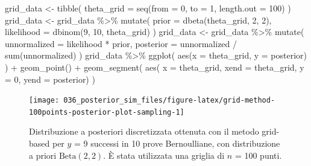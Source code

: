 \documentclass[
  10pt,
  italian,
  a4paper,
  extrafontsizes,onecolumn,openright
  ]{memoir}
\newenvironment{Shaded}{\begin{snugshade}}{\end{snugshade}}
\newcommand{\AttributeTok}[1]{\textcolor[rgb]{0.77,0.63,0.00}{#1}}
\newcommand{\DecValTok}[1]{\textcolor[rgb]{0.00,0.00,0.81}{#1}}
\newcommand{\FunctionTok}[1]{\textcolor[rgb]{0.00,0.00,0.00}{#1}}
\newcommand{\NormalTok}[1]{#1}
\newcommand{\OtherTok}[1]{\textcolor[rgb]{0.56,0.35,0.01}{#1}}
\newcommand{\SpecialCharTok}[1]{\textcolor[rgb]{0.00,0.00,0.00}{#1}}
\begin{document}
\begin{Shaded}
\begin{Highlighting}[]
\NormalTok{grid\_data  }\OtherTok{\textless{}{-}} \FunctionTok{tibble}\NormalTok{(}
  \AttributeTok{theta\_grid =} \FunctionTok{seq}\NormalTok{(}\AttributeTok{from =} \DecValTok{0}\NormalTok{, }\AttributeTok{to =} \DecValTok{1}\NormalTok{, }\AttributeTok{length.out =} \DecValTok{100}\NormalTok{)}
\NormalTok{)}
\NormalTok{grid\_data }\OtherTok{\textless{}{-}}\NormalTok{ grid\_data }\SpecialCharTok{\%\textgreater{}\%}
  \FunctionTok{mutate}\NormalTok{(}
    \AttributeTok{prior =} \FunctionTok{dbeta}\NormalTok{(theta\_grid, }\DecValTok{2}\NormalTok{, }\DecValTok{2}\NormalTok{),}
    \AttributeTok{likelihood =} \FunctionTok{dbinom}\NormalTok{(}\DecValTok{9}\NormalTok{, }\DecValTok{10}\NormalTok{, theta\_grid)}
\NormalTok{  )}
\NormalTok{grid\_data }\OtherTok{\textless{}{-}}\NormalTok{ grid\_data }\SpecialCharTok{\%\textgreater{}\%}
  \FunctionTok{mutate}\NormalTok{(}
    \AttributeTok{unnormalized =}\NormalTok{ likelihood }\SpecialCharTok{*}\NormalTok{ prior,}
    \AttributeTok{posterior =}\NormalTok{ unnormalized }\SpecialCharTok{/} \FunctionTok{sum}\NormalTok{(unnormalized)}
\NormalTok{  )}
\NormalTok{grid\_data }\SpecialCharTok{\%\textgreater{}\%} 
\FunctionTok{ggplot}\NormalTok{(}
  \FunctionTok{aes}\NormalTok{(}\AttributeTok{x =}\NormalTok{ theta\_grid, }\AttributeTok{y =}\NormalTok{ posterior)}
\NormalTok{) }\SpecialCharTok{+}
  \FunctionTok{geom\_point}\NormalTok{() }\SpecialCharTok{+}
  \FunctionTok{geom\_segment}\NormalTok{(}
    \FunctionTok{aes}\NormalTok{(}
      \AttributeTok{x =}\NormalTok{ theta\_grid, }
      \AttributeTok{xend =}\NormalTok{ theta\_grid, }
      \AttributeTok{y =} \DecValTok{0}\NormalTok{, }
      \AttributeTok{yend =}\NormalTok{ posterior)}
\NormalTok{  )}
\end{Highlighting}
\end{Shaded}

\begin{figure}[h]

{\centering \texttt{[image: 036\_posterior\_sim\_files/figure-latex/grid-method-100points-posterior-plot-sampling-1]} 

}

\caption{Distribuzione a posteriori discretizzata ottenuta con il metodo grid-based per $y$ = 9 successi in 10 prove Bernoulliane, con distribuzione a priori $\mbox{Beta}(2, 2)$. È stata utilizzata una griglia di $n$ = 100 punti.}\label{fig:grid-method-100points-posterior-plot-sampling}
\end{figure}
\end{document}
